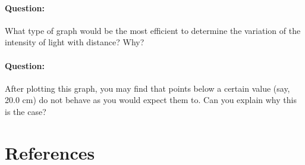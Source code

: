 \begin{refsection}
\begin{enumerate}
    \begin{question}
    \paragraph{Question:} What type of graph would be the most efficient to determine the variation of the intensity of light with distance? Why? 
    
    \paragraph{Question:} After plotting this graph, you may find that points below a certain value (say, 20.0 cm) do not behave as you would expect them to. Can you explain why this is the case?
    \end{question}
\end{enumerate}



\section*{References}





\nocite{schubert_light-emitting_2006}
\nocite{noauthor_photodiode_2016}

\printbibliography[heading=none]

\newpage
\end{refsection}